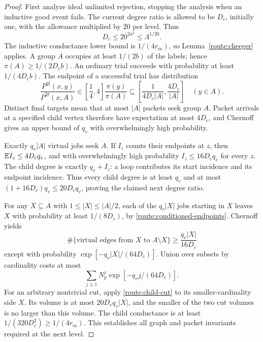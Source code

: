\begin{proof}
First analyze ideal unlimited rejection, stopping the analysis when
an inductive good event fails.  The current degree ratio is allowed
to be $D_c$, initially one, with the allowance multiplied by $20$
per level.  Thus
\[
 D_c\le20^{2a^2}\le\Lambda^{1/20}.
\]
The inductive conductance lower bound is $1/(4r_m)$, so
Lemma~\ref{route:cheeger} applies.  A group $A$ occupies at least
$1/(2b)$ of the labels; hence $\pi(A)\ge1/(2D_cb)$.
An ordinary trial succeeds with probability at least
$1/(4D_cb)$.  The endpoint of a successful trial has distribution
\begin{equation}\label{route:conditioned-endpoints}
 \frac{P^{2t}(x,y)}{P^{2t}(x,A)}
 \in\left[\frac14,4\right]\frac{\pi(y)}{\pi(A)}
 \subseteq\left[\frac{1}{4D_c|A|},\frac{4D_c}{|A|}\right]
 \quad(y\in A).
\end{equation}
Distinct final targets mean that at most $|A|$ packets seek group
$A$.  Packet arrivals at a specified child vertex therefore have
expectation at most $4D_c$, and Chernoff gives an upper bound of
$q_v$ with overwhelmingly high probability.

Exactly $q_v|A|$ virtual jobs seek $A$.  If $I_z$ counts their
endpoints at $z$, then $\mathbb E I_z\le4D_cq_v$, and with overwhelmingly
high probability $I_z\le16D_cq_v$ for every $z$.  The child degree
is exactly $q_v+I_z$: a loop contributes its start incidence and
its endpoint incidence.  Thus every child degree is at least $q_v$
and at most $(1+16D_c)q_v\le20D_cq_v$, proving the claimed next
degree ratio.

For any $X\subseteq A$ with $1\le|X|\le|A|/2$, each of the
$q_v|X|$ jobs starting in $X$ leaves $X$ with probability at least
$1/(8D_c)$, by \eqref{route:conditioned-endpoints}.  Chernoff yields
\begin{equation}\label{route:child-cut}
 \#\{\text{virtual edges from $X$ to $A\setminus X$}\}
       \ge\frac{q_v|X|}{16D_c}
\end{equation}
except with probability $\exp[-q_v|X|/(64D_c)]$.
Union over subsets by cardinality costs at most
\begin{equation}\label{route:cut-union}
 \sum_{j\ge1}N_p^j\exp[-q_vj/(64D_c)].
\end{equation}
For an arbitrary nontrivial cut, apply \eqref{route:child-cut} to
its smaller-cardinality side $X$.  Its volume is at most
$20D_cq_v|X|$, and the smaller of the two cut volumes is no larger
than this volume.  The child conductance is at least
$1/(320D_c^2)\ge1/(4r_m)$.  This establishes all graph and packet
invariants required at the next level.


\end{proof}
